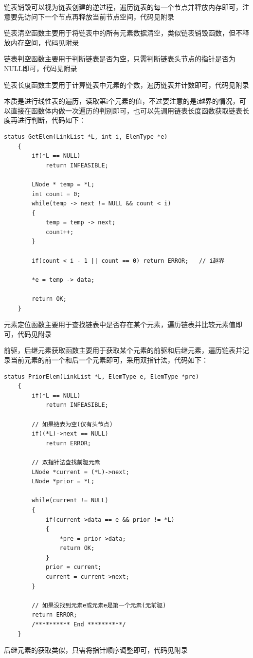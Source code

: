 \documentclass[supercite]{Experimental_Report}
\theoremstyle{definition}
\begin{document}
	链表销毁可以视为链表创建的逆过程，遍历链表的每一个节点并释放内存即可，注意要先访问下一个节点再释放当前节点空间，代码见附录

	链表清空函数主要用于将链表中的所有元素数据清空，类似链表销毁函数，但不释放内存空间，代码见附录

	链表判空函数主要用于判断链表是否为空，只需判断链表头节点的指针是否为NULL即可，代码见附录

	链表长度函数主要用于计算链表中元素的个数，遍历链表并计数即可，代码见附录

	本质是进行线性表的遍历，读取第i个元素的值，不过要注意的是i越界的情况，可以直接在函数体内做一次遍历的判别即可，也可以先调用链表长度函数获取链表长度再进行判断，代码如下：
	\begin{lstlisting}[caption={元素定位}, label=lst:locate_elem]
	status GetElem(LinkList *L, int i, ElemType *e)
	{
		if(*L == NULL)
			return INFEASIBLE;
		
		LNode * temp = *L;
		int count = 0;
		while(temp -> next != NULL && count < i)
		{
			temp = temp -> next;
			count++;
		}

		if(count < i - 1 || count == 0) return ERROR;	// i越界

		*e = temp -> data;

		return OK;
	}
\end{lstlisting}

	元素定位函数主要用于查找链表中是否存在某个元素，遍历链表并比较元素值即可，代码见附录

	前驱，后继元素获取函数主要用于获取某个元素的前驱和后继元素，遍历链表并记录当前元素的前一个和后一个元素即可，采用双指针法，代码如下：
	\begin{lstlisting}[caption={前驱，后继元素获取}, label=lst:get_adjacent_elem]
	status PriorElem(LinkList *L, ElemType e, ElemType *pre)
	{
		if(*L == NULL)
			return INFEASIBLE;
		
		// 如果链表为空(仅有头节点)
		if((*L)->next == NULL)
			return ERROR;
			
		// 双指针法查找前驱元素
		LNode *current = (*L)->next;
		LNode *prior = *L;
		
		while(current != NULL)
		{
			if(current->data == e && prior != *L)
			{
				*pre = prior->data;
				return OK;
			}
			prior = current;
			current = current->next;
		}
		
		// 如果没找到元素e或元素e是第一个元素(无前驱)
		return ERROR;
		/********** End **********/
	}
	\end{lstlisting}
	后继元素的获取类似，只需将指针顺序调整即可，代码见附录
\end{document}
